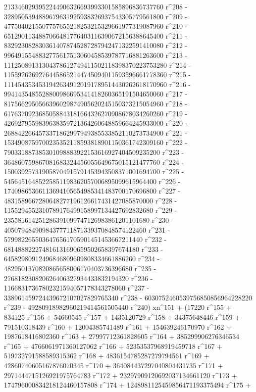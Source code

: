        2133460293952244906326693993301585896836737760 r^208 - 
       3289505394889679631925938326937543305779561800 r^209 - 
       4775040215507757655218253215329661977319087960 r^210 - 
       6512901134887066481776403116390672156388645400 r^211 - 
       8329230828303614078745287287942471322591410080 r^212 - 
       9964915548832775617513060458539787716881263600 r^213 - 
       11125089131304378612749411502118398370223753280 r^214 - 
       11559262692764458652144745094011593596661778360 r^215 - 
       11145435345319426349120191789514430262618170960 r^216 - 
       9941435485528800986695341418260365191504650060 r^217 - 
       8175662950566396029874905620245150373215054960 r^218 - 
       6176370923685058843181664326270908678034260260 r^219 - 
       4269279559839638359721364260648859664245933000 r^220 - 
       2688422664573371862997949385533852110273734900 r^221 - 
       1534908759700235352118593818901150361742309160 r^222 - 
       790331887385301098883922153616927404509235200 r^223 - 
       364860759867081683324456055649675015121477760 r^224 - 
       150039257319058704915791453943508371001694700 r^225 - 
       54564516485225851198362057006895099615964400 r^226 - 
       17409865366113694105654985341483700170696800 r^227 - 
       4831589667280648277196126617431427085870000 r^228 - 
       1155294552310789176499158997134427692832680 r^229 - 
       235581614251286391099747126983861201101680 r^230 - 
       40507948490984377711871339370848574122460 r^231 - 
       5799822655036476561705901451453667211440 r^232 - 
       681488822274816131690659502658397674180 r^233 - 
       64582980912496846809609808334661886260 r^234 - 
       4829501370820865658006170403736396680 r^235 - 
       276818230820626406327934433832194320 r^236 - 
       11668317367802321594057178343278060 r^237 - 
       338961459724439672107027829765340 r^238 - 
       6030752460539756850856964228220 r^239 - 
       49280918982960219414561505440 r^240) xn^151 + (17220 r^155 + 
       834125 r^156 + 54660545 r^157 + 1435120729 r^158 + 
       34375648446 r^159 + 791510318439 r^160 + 
       12004385741489 r^161 + 154639246170970 r^162 + 
       1987618416802360 r^163 + 27997712361828605 r^164 + 
       385299906276346534 r^165 + 4766061971360127062 r^166 + 
       52353537968919459718 r^167 + 519732791588589315362 r^168 + 
       4836154785287279794561 r^169 + 42860740605167876070345 r^170 + 
       364084437297040804431735 r^171 + 
       2971444715126921975764783 r^172 + 
       23297909120692037134661120 r^173 + 
       174796000834218124460157808 r^174 + 
       1248981125459856471193375494 r^175 + 
